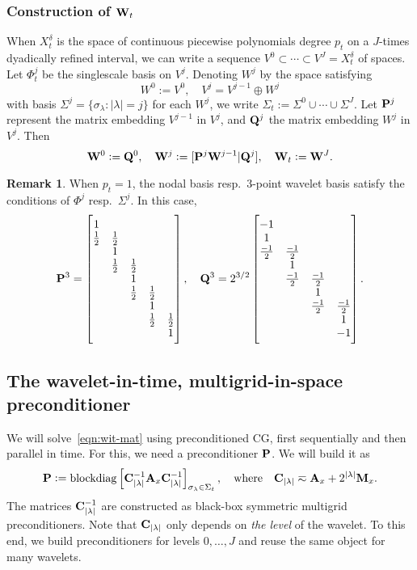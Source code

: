 \documentclass[11pt,a4paper]{amsart}
\theoremstyle{definition}
\newtheorem*{remark}{Remark}
\DeclareMathOperator{\blockdiag}{blockdiag}
\begin{document}
\subsubsection*{Construction of ${\bf W}_t$}
When $X^\delta_t$ is the space of continuous piecewise polynomials degree $p_t$ on a $J$-times dyadically refined interval,
we can write a sequence $V^0 \subset \cdots \subset V^J = X^\delta_t$ of spaces.
Let $\Phi^j_t$ be the singlescale basis on $V^j$. Denoting $W^j$ by the space satisfying
\[
  W^0 := V^0, \quad V^j = V^{j-1} \oplus W^j
\]
with basis $\Sigma^j = \{\sigma_\lambda : |\lambda| = j \}$ for each $W^j$, we write $\Sigma_t := \Sigma^0 \cup \cdots \cup \Sigma^J$.
Let ${\bf P}^j$ represent the matrix embedding $V^{j-1}$ in $V^j$, and ${\bf Q}^j$
the matrix embedding $W^j$ in $V^j$. Then
\[
  {\bf W}^0 := {\bf Q}^0, \quad {\bf W}^j := [{\bf P}^j {\bf W}^{j-1} | {\bf Q}^j], \quad {\bf W}_t := {\bf W}^J.
\]
\begin{remark}
  When $p_t = 1$, the nodal basis resp.~3-point wavelet basis satisfy the conditions of $\Phi^j$ resp.~$\Sigma^j$.
  In this case,
\[
  {\bf P}^3 = \begin{bmatrix}1 \\ 1\over2 & 1\over2 \\ & 1  \\ & 1\over2 & 1\over2 \\ &&1 \\ &&1\over2 & 1\over2 \\ &&&1 \\ &&& 1\over2 & 1\over2 \\ &&&&1\end{bmatrix}, \quad {\bf Q}^3 = 2^{3/2} \begin{bmatrix} -1 \\ 1 \\ -1\over2 & -1\over2 \\ &1 \\ &-1\over2 & -1\over2 \\ &&1 \\ &&-1\over2 & -1\over2 \\ &&&1 \\ &&&-1\end{bmatrix}.
\]
\end{remark}

\subsection*{The wavelet-in-time, multigrid-in-space preconditioner}
We will solve~\eqref{eqn:wit-mat} using preconditioned CG, first sequentially and then parallel in time.
For this, we need a preconditioner ${\bf P}$. We will build it as
\[
  {\bf P} := \blockdiag\left[ {\bf C}_{|\lambda|}^{-1} {\bf A}_x {\bf C}_{|\lambda|}^{-1} \right]_{\sigma_\lambda \in \Sigma_t}, \quad \text{where} \quad {\bf C}_{|\lambda|} \eqsim {\bf A}_x + 2^{|\lambda|} {\bf M}_x.
\]
The matrices ${\bf C}_{|\lambda|}^{-1}$ are constructed as black-box symmetric multigrid preconditioners. Note that ${\bf C}_{|\lambda|}$ only depends on \emph{the level} of the wavelet. To this end, we build preconditioners for levels $0, \ldots, J$ and reuse the same object for many wavelets.
\end{document}
